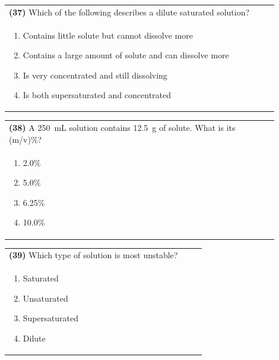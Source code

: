 \documentclass{article}
\begin{document}
\noindent\begin{tabular}{|p{0.9\linewidth}|}
\hline
\textbf{(37)} Which of the following describes a dilute saturated solution?\\[0.2cm]
\begin{minipage}[t]{0.85\linewidth}
\begin{enumerate}[label=\alph*.]
\item Contains little solute but cannot dissolve more
\item Contains a large amount of solute and can dissolve more
\item Is very concentrated and still dissolving
\item Is both supersaturated and concentrated
\end{enumerate}
\end{minipage}\\[0.2cm]
\hline
\end{tabular}

\noindent\begin{tabular}{|p{0.9\linewidth}|}
\hline
\textbf{(38)} A 250~mL solution contains 12.5~g of solute. What is its (m/v)\%?\\[0.2cm]
\begin{minipage}[t]{0.85\linewidth}
\begin{enumerate}[label=\alph*.]
\item 2.0\%
\item 5.0\%
\item 6.25\%
\item 10.0\%
\end{enumerate}
\end{minipage}\\[0.2cm]
\hline
\end{tabular}

\noindent\begin{tabular}{|p{0.9\linewidth}|}
\hline
\textbf{(39)} Which type of solution is most unstable?\\[0.2cm]
\begin{minipage}[t]{0.85\linewidth}
\begin{enumerate}[label=\alph*.]
\item Saturated
\item Unsaturated
\item Supersaturated
\item Dilute
\end{enumerate}
\end{minipage}\\[0.2cm]
\hline
\end{tabular}
\end{document}
